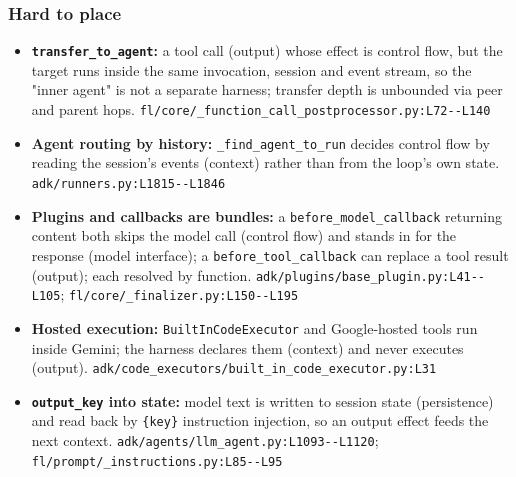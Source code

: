 \subsubsection*{Hard to place}
\begin{itemize}
\item \textbf{\texttt{transfer\_\allowbreak{}to\_\allowbreak{}agent}:} a tool call (output) whose effect is control flow, but the target runs inside the same invocation, session and event stream, so the "inner agent" is not a separate harness; transfer depth is unbounded via peer and parent hops. \texttt{fl/\allowbreak{}core/\allowbreak{}\_\allowbreak{}function\_\allowbreak{}call\_\allowbreak{}postprocessor.\allowbreak{}py:\allowbreak{}L72-\allowbreak{}-\allowbreak{}L140}
\item \textbf{Agent routing by history:} \texttt{\_\allowbreak{}find\_\allowbreak{}agent\_\allowbreak{}to\_\allowbreak{}run} decides control flow by reading the session's events (context) rather than from the loop's own state. \texttt{adk/\allowbreak{}runners.\allowbreak{}py:\allowbreak{}L1815-\allowbreak{}-\allowbreak{}L1846}
\item \textbf{Plugins and callbacks are bundles:} a \texttt{before\_\allowbreak{}model\_\allowbreak{}callback} returning content both skips the model call (control flow) and stands in for the response (model interface); a \texttt{before\_\allowbreak{}tool\_\allowbreak{}callback} can replace a tool result (output); each resolved by function. \texttt{adk/\allowbreak{}plugins/\allowbreak{}base\_\allowbreak{}plugin.\allowbreak{}py:\allowbreak{}L41-\allowbreak{}-\allowbreak{}L105}; \texttt{fl/\allowbreak{}core/\allowbreak{}\_\allowbreak{}finalizer.\allowbreak{}py:\allowbreak{}L150-\allowbreak{}-\allowbreak{}L195}
\item \textbf{Hosted execution:} \texttt{BuiltInCodeExecutor} and Google-hosted tools run inside Gemini; the harness declares them (context) and never executes (output). \texttt{adk/\allowbreak{}code\_\allowbreak{}executors/\allowbreak{}built\_\allowbreak{}in\_\allowbreak{}code\_\allowbreak{}executor.\allowbreak{}py:\allowbreak{}L31}
\item \textbf{\texttt{output\_\allowbreak{}key} into state:} model text is written to session state (persistence) and read back by \texttt{\{key\}} instruction injection, so an output effect feeds the next context. \texttt{adk/\allowbreak{}agents/\allowbreak{}llm\_\allowbreak{}agent.\allowbreak{}py:\allowbreak{}L1093-\allowbreak{}-\allowbreak{}L1120}; \texttt{fl/\allowbreak{}prompt/\allowbreak{}\_\allowbreak{}instructions.\allowbreak{}py:\allowbreak{}L85-\allowbreak{}-\allowbreak{}L95}
\end{itemize}

